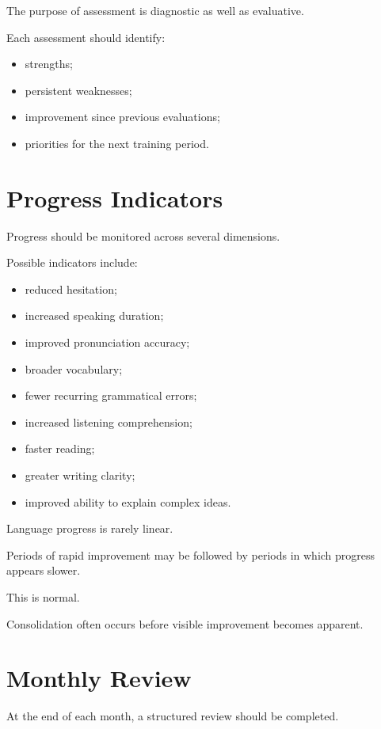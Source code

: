 The purpose of assessment is diagnostic as well as evaluative.

Each assessment should identify:

\begin{itemize}
    \item strengths;
    \item persistent weaknesses;
    \item improvement since previous evaluations;
    \item priorities for the next training period.
\end{itemize}

\section*{Progress Indicators}

Progress should be monitored across several dimensions.

Possible indicators include:

\begin{itemize}
    \item reduced hesitation;
    \item increased speaking duration;
    \item improved pronunciation accuracy;
    \item broader vocabulary;
    \item fewer recurring grammatical errors;
    \item increased listening comprehension;
    \item faster reading;
    \item greater writing clarity;
    \item improved ability to explain complex ideas.
\end{itemize}

Language progress is rarely linear.

Periods of rapid improvement may be followed by periods in which progress appears slower.

This is normal.

Consolidation often occurs before visible improvement becomes apparent.

\section*{Monthly Review}

At the end of each month, a structured review should be completed.

